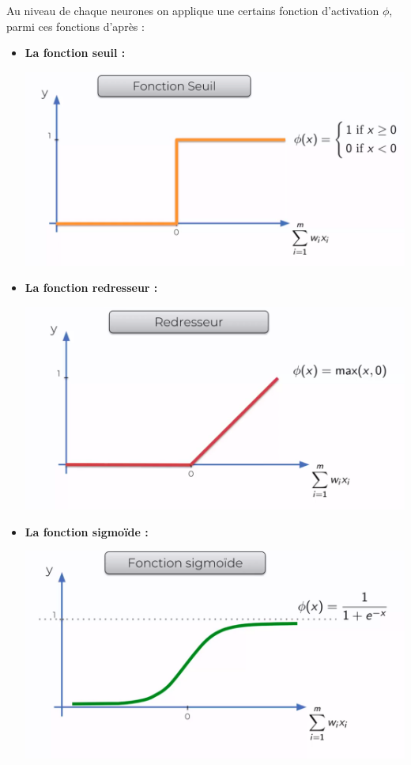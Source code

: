 Au niveau de chaque neurones on applique une certains fonction d'activation $\phi$, parmi ces fonctions d’après \cite{glorot2011deep} :
\begin{itemize}
\item \textbf{La fonction seuil :} 
\begin{center}
	\includegraphics[scale=0.2]{img19.png}
\end{center}
\newpage
\item \textbf{La fonction redresseur :} 
\begin{center}
	\includegraphics[scale=0.2]{img21.png}
\end{center}
\item \textbf{La fonction sigmoïde :} 
\begin{center}
	\includegraphics[scale=0.2]{img20.png}

\end{center}
\end{itemize}
